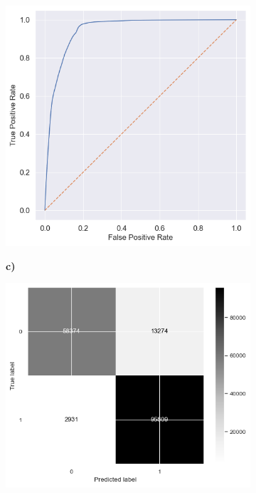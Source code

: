 \begin{figure}[!htbp]
\begin{center}
\begin{minipage}[b]{0.5\textwidth}
\begin{subfigure}[t]{0.9\textwidth}
            \includegraphics[width=\linewidth, valign=t]{images/Model_Training/Initial_ROC_curve_square.png}
        \end{subfigure}
    \end{minipage}%
    \hfill\allowbreak%
    \begin{minipage}[b]{0.5\textwidth}
        \centering
        \begin{subfigure}[t]{0.06\textwidth}
            \textbf{c)}
        \end{subfigure}
        \begin{subfigure}[t]{0.9\textwidth}
            \includegraphics[width=\linewidth, valign=t]{images/Model_Training/Initial_Confusion_Matrix.png}
        \end{subfigure}
    \end{minipage}
    \end{center}


\end{figure}
